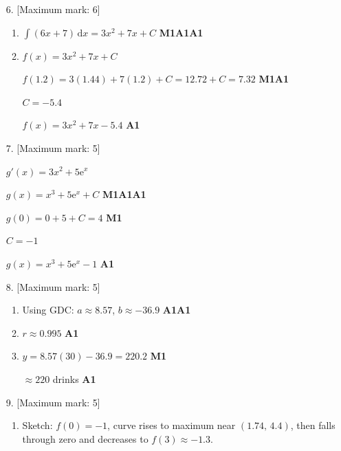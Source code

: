 \documentclass[12pt, twoside]{article}
\begin{document}
\begin{enumerate}[itemsep=0.15cm]
\item[6.] [Maximum mark: 6]

\begin{enumerate}
  \item $\displaystyle\int(6x+7)\,\mathrm{d}x = 3x^{2} + 7x + C$ \hfill \textbf{M1A1A1}

  \item $f(x) = 3x^{2} + 7x + C$

  $f(1.2) = 3(1.44) + 7(1.2) + C = 12.72 + C = 7.32$ \hfill \textbf{M1A1}

  $C = -5.4$

  $f(x) = 3x^{2} + 7x - 5.4$ \hfill \textbf{A1}
\end{enumerate}

\bigskip

\item[7.] [Maximum mark: 5]

$g'(x) = 3x^{2} + 5\mathrm{e}^{x}$

$g(x) = x^{3} + 5\mathrm{e}^{x} + C$ \hfill \textbf{M1A1A1}

$g(0) = 0 + 5 + C = 4$ \hfill \textbf{M1}

$C = -1$

$g(x) = x^{3} + 5\mathrm{e}^{x} - 1$ \hfill \textbf{A1}

\bigskip

\item[8.] [Maximum mark: 5]

\begin{enumerate}
  \item Using GDC: $a \approx 8.57$, $b \approx -36.9$ \hfill \textbf{A1A1}

  \item $r \approx 0.995$ \hfill \textbf{A1}

  \item $y = 8.57(30) - 36.9 = 220.2$ \hfill \textbf{M1}

  $\approx 220$ drinks \hfill \textbf{A1}
\end{enumerate}

\bigskip

\item[9.] [Maximum mark: 5]

\begin{enumerate}
  \item Sketch: $f(0) = -1$, curve rises to maximum near $(1.74,\, 4.4)$,
        then falls through zero and decreases to $f(3) \approx -1.3$.


\end{enumerate}
\end{enumerate}
\end{document}

